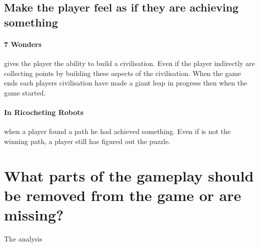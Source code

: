 \documentclass[a4paper]{article}
\begin{document}
\subsection{Make the player feel as if they are achieving something}
\paragraph{7 Wonders} gives the player the ability to build a civilisation. Even if the player indirectly are collecting points by building these aspects of the civilisation. When the game ends each players civilisation have made a giant leap in progress then when the game started. 

\paragraph{In Ricocheting Robots} when a player found a path he had achieved something. Even if is not the winning path, a player still has figured out the puzzle.

\section{What parts of the gameplay should be removed from the game or are missing?}
The analysis 


\newpage


\end{document}
